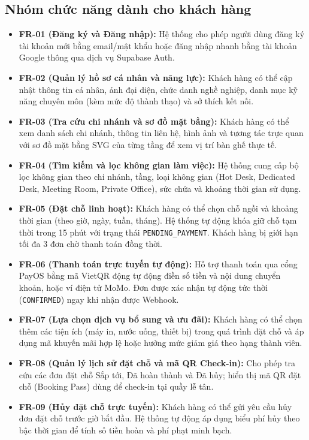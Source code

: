 \subsection{Nhóm chức năng dành cho khách hàng}
\begin{itemize}
    \item \textbf{FR-01 (Đăng ký và Đăng nhập):} Hệ thống cho phép người dùng đăng ký tài khoản mới bằng email/mật khẩu hoặc đăng nhập nhanh bằng tài khoản Google thông qua dịch vụ Supabase Auth.
    \item \textbf{FR-02 (Quản lý hồ sơ cá nhân và năng lực):} Khách hàng có thể cập nhật thông tin cá nhân, ảnh đại diện, chức danh nghề nghiệp, danh mục kỹ năng chuyên môn (kèm mức độ thành thạo) và sở thích kết nối.
    \item \textbf{FR-03 (Tra cứu chi nhánh và sơ đồ mặt bằng):} Khách hàng có thể xem danh sách chi nhánh, thông tin liên hệ, hình ảnh và tương tác trực quan với sơ đồ mặt bằng SVG của từng tầng để xem vị trí bàn ghế thực tế.
    \item \textbf{FR-04 (Tìm kiếm và lọc không gian làm việc):} Hệ thống cung cấp bộ lọc không gian theo chi nhánh, tầng, loại không gian (Hot Desk, Dedicated Desk, Meeting Room, Private Office), sức chứa và khoảng thời gian sử dụng.
    \item \textbf{FR-05 (Đặt chỗ linh hoạt):} Khách hàng có thể chọn chỗ ngồi và khoảng thời gian (theo giờ, ngày, tuần, tháng). Hệ thống tự động khóa giữ chỗ tạm thời trong 15 phút với trạng thái \texttt{PENDING\_PAYMENT}. Khách hàng bị giới hạn tối đa 3 đơn chờ thanh toán đồng thời.
    \item \textbf{FR-06 (Thanh toán trực tuyến tự động):} Hỗ trợ thanh toán qua cổng PayOS bằng mã VietQR động tự động điền số tiền và nội dung chuyển khoản, hoặc ví điện tử MoMo. Đơn được xác nhận tự động tức thời (\texttt{CONFIRMED}) ngay khi nhận được Webhook.
    \item \textbf{FR-07 (Lựa chọn dịch vụ bổ sung và ưu đãi):} Khách hàng có thể chọn thêm các tiện ích (máy in, nước uống, thiết bị) trong quá trình đặt chỗ và áp dụng mã khuyến mãi hợp lệ hoặc hưởng mức giảm giá theo hạng thành viên.
    \item \textbf{FR-08 (Quản lý lịch sử đặt chỗ và mã QR Check-in):} Cho phép tra cứu các đơn đặt chỗ Sắp tới, Đã hoàn thành và Đã hủy; hiển thị mã QR đặt chỗ (Booking Pass) dùng để check-in tại quầy lễ tân.
    \item \textbf{FR-09 (Hủy đặt chỗ trực tuyến):} Khách hàng có thể gửi yêu cầu hủy đơn đặt chỗ trước giờ bắt đầu. Hệ thống tự động áp dụng biểu phí hủy theo bậc thời gian để tính số tiền hoàn và phí phạt minh bạch.

\end{itemize}
